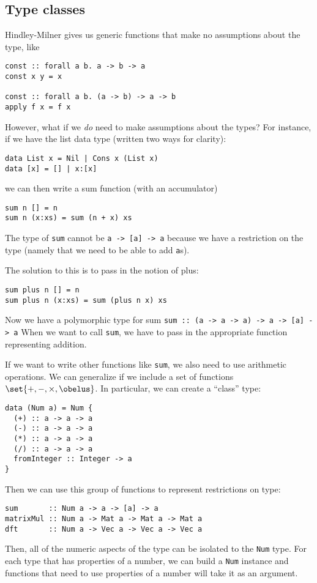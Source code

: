 \documentclass[class=scrartcl]{standalone}
\begin{document}
\subsection{Type classes}
Hindley-Milner gives us generic functions that
make no assumptions about the type, like
\begin{verbatim}
const :: forall a b. a -> b -> a
const x y = x

const :: forall a b. (a -> b) -> a -> b
apply f x = f x
\end{verbatim}

However, what if we \emph{do} need to make assumptions about the types?
For instance, if we have the list data type (written two ways for clarity):
\begin{verbatim}
data List x = Nil | Cons x (List x)
data [x] = [] | x:[x]
\end{verbatim}
we can then write a sum function (with an accumulator)
\begin{verbatim}
sum n [] = n
sum n (x:xs) = sum (n + x) xs
\end{verbatim}
The type of \texttt{sum}
cannot be \texttt{a -> [a] -> a}
because we have a restriction on the type
(namely that we need to be able to add \texttt{a}s).

The solution to this is to pass in the notion of plus:
\begin{verbatim}
sum plus n [] = n
sum plus n (x:xs) = sum (plus n x) xs
\end{verbatim}
Now we have a polymorphic type for sum
\texttt{sum :: (a -> a -> a) -> a -> [a] -> a} %
When we want to call \texttt{sum},
we have to pass in the appropriate function representing addition.

If we want to write other functions like \texttt{sum},
we also need to use arithmetic operations.
We can generalize if we include a set of functions
\(\set{+, -, \times, \obelus}\).
In particular, we can create a ``class'' type:
\begin{verbatim}
data (Num a) = Num {
  (+) :: a -> a -> a
  (-) :: a -> a -> a
  (*) :: a -> a -> a
  (/) :: a -> a -> a
  fromInteger :: Integer -> a
}
\end{verbatim}
Then we can use this group of functions to represent restrictions on type:
\begin{verbatim}
sum       :: Num a -> a -> [a] -> a
matrixMul :: Num a -> Mat a -> Mat a -> Mat a
dft       :: Num a -> Vec a -> Vec a -> Vec a
\end{verbatim}
Then, all of the numeric aspects of the type
can be isolated to the \texttt{Num} type.
For each type that has properties of a number,
we can build a \texttt{Num} instance
and functions that need to use properties of a number
will take it as an argument.
\end{document}
